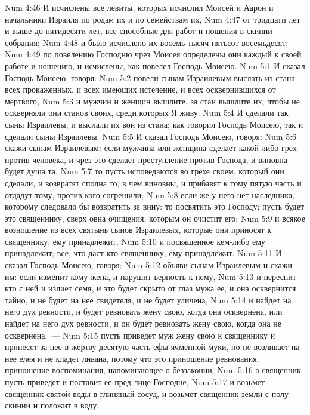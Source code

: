 \vs Num 4:46 И исчислены все левиты, которых исчислил Моисей и Аарон и начальники Израиля по родам их и по семействам их,
\vs Num 4:47 от тридцати лет и выше до пятидесяти лет, все способные  для работ и ношения в скинии собрания;
\vs Num 4:48 и было исчислено их восемь тысяч пятьсот восемьдесят;
\vs Num 4:49 по повелению Господню чрез Моисея определены они каждый к своей работе и ношению, и исчислены, как повелел Господь Моисею.
\vs Num 5:1 И сказал Господь Моисею, говоря:
\vs Num 5:2 повели сынам Израилевым выслать из стана всех прокаженных, и всех имеющих истечение, и всех осквернившихся от мертвого,
\vs Num 5:3 и мужчин и женщин вышлите, за стан вышлите их, чтобы не оскверняли они станов своих, среди которых Я живу.
\vs Num 5:4 И сделали так сыны Израилевы, и выслали их вон из стана; как говорил Господь Моисею, так и сделали сыны Израилевы.
\rsbpar\vs Num 5:5 И сказал Господь Моисею, говоря:
\vs Num 5:6 скажи сынам Израилевым: если мужчина или женщина сделает какой-либо грех против человека, и чрез это сделает преступление против Господа, и виновна будет душа та,
\vs Num 5:7 то пусть исповедаются во грехе своем, который они сделали, и возвратят сполна то, в чем виновны, и прибавят к тому пятую часть и отдадут тому, против кого согрешили;
\vs Num 5:8 если же у него нет наследника, которому следовало бы возвратить за вину: то посвятить это Господу; пусть будет это священнику, сверх овна очищения, которым он очистит его;
\vs Num 5:9 и всякое возношение из всех святынь сынов Израилевых, которые они приносят к священнику, ему принадлежит,
\vs Num 5:10 и посвященное кем-либо ему принадлежит; все, что даст кто священнику, ему принадлежит.
\rsbpar\vs Num 5:11 И сказал Господь Моисею, говоря:
\vs Num 5:12 объяви сынам Израилевым и скажи им: если изменит кому жена, и нарушит верность к нему,
\vs Num 5:13 и переспит кто с ней и излиет семя, и это будет скрыто от глаз мужа ее, и она осквернится тайно, и не будет на нее свидетеля, и не будет уличена,
\vs Num 5:14 и найдет на него дух ревности, и будет ревновать жену свою, когда она осквернена, или найдет на него дух ревности, и он будет ревновать жену свою, когда она не осквернена,~---
\vs Num 5:15 пусть приведет муж жену свою к священнику и принесет за нее в жертву десятую часть ефы ячменной муки, но не возливает на нее елея и не кладет ливана, потому что это приношение ревнования, приношение воспоминания, напоминающее о беззаконии;
\vs Num 5:16 а священник пусть приведет и поставит ее пред лице Господне,
\vs Num 5:17 и возьмет священник святой воды в глиняный сосуд, и возьмет священник земли с полу скинии и положит в воду;
